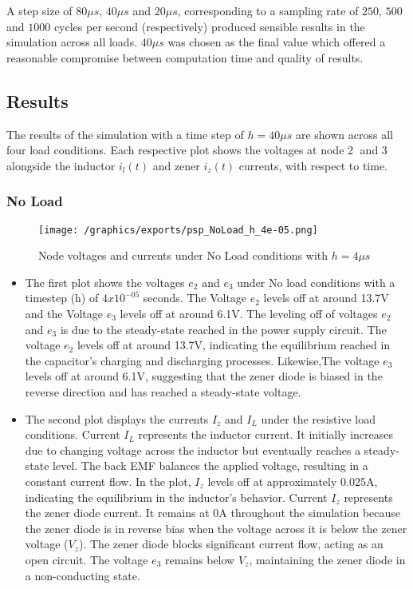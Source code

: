 A step size of $80\mu s$, $40 \mu s$ and $20 \mu s$, corresponding to a sampling rate of $250$, $500$ and $1000$ cycles per second (respectively) produced sensible results in the simulation across all loads. $40 \mu s$ was chosen as the final value which offered a reasonable compromise between computation time and quality of results. 

\pagebreak
\subsection{Results}
The results of the simulation with a time step of $h = 40 \mu s$ are shown across all four load conditions. Each respective plot shows the voltages at node \textcircled{2} and \textcircled{3} alongside the inductor $i_l(t)$ and zener $i_z(t)$ currents, with respect to time.

\subsubsection{No Load}
\begin{figure}[H]
    \centering
    \texttt{[image: /graphics/exports/psp\_NoLoad\_h\_4e-05.png]}
    \caption{Node voltages and currents under No Load conditions with $h=4\mu s$}
\end{figure}
\begin{itemize}
	\item The first plot shows the voltages $e_2$ and $e_3$ under No load conditions with a timestep (h) of $4x10^{-05}$ seconds. The Voltage $e_2$ levels off at around 13.7V and the Voltage $e_3$ levels off at around 6.1V. The leveling off of voltages $e_2$ and $e_3$ is due to the steady-state reached in the power supply circuit. The voltage $e_2$ levels off at around 13.7V, indicating the equilibrium reached in the capacitor's charging and discharging processes. Likewise,The voltage $e_3$ levels off at around 6.1V, suggesting that the zener diode is biased in the reverse direction and has reached a steady-state voltage.
    \item The second plot displays the currents $I_z$ and $I_L$ under the resistive load conditions. Current $I_L$ represents the inductor current. It initially increases due to changing voltage across the inductor but eventually reaches a steady-state level. The back EMF balances the applied voltage, resulting in a constant current flow. In the plot, $I_z$ levels off at approximately 0.025A, indicating the equilibrium in the inductor's behavior. Current $I_z$ represents the zener diode current. It remains at 0A throughout the simulation because the zener diode is in reverse bias when the voltage across it is below the zener voltage ($V_z$). The zener diode blocks significant current flow, acting as an open circuit. The voltage $e_3$ remains below $V_z$, maintaining the zener diode in a non-conducting state.
\end{itemize}

